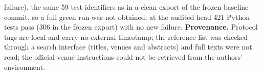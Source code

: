 failure), the same 59 test identifiers as in a clean export of the frozen baseline commit, so a full green run was not obtained; at the audited head 421 Python tests pass (306 in the frozen export) with no new failure. \textbf{Provenance.} Protocol tags are local and carry no external timestamp; the reference list was checked through a search interface (titles, venues and abstracts) and full texts were not read; the official venue instructions could not be retrieved from the authors' environment.
